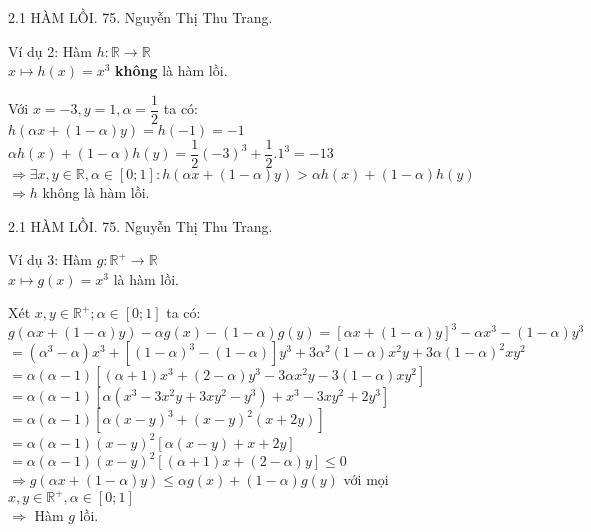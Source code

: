 \begin{frame}{2.1 HÀM LỒI. \hspace{6cm}  75. Nguyễn Thị Thu Trang.}
\begin{block}{Ví dụ 2: }
Hàm $h: \mathbb{R} \longrightarrow \mathbb{R}$\\
\hspace{1.2cm} $x\longmapsto h(x)= x^3$ \textbf{không} là hàm lồi.
\end{block}
Với $x = -3, y = 1, \alpha = \dfrac{1}{2}$ ta có:\\
$h(\alpha x+(1 -\alpha)y) = h(-1)=-1 $\\
$\alpha h(x) + (1-\alpha)h(y)= \dfrac{1}{2}(-3)^3 +\dfrac{1}{2}. 1^3 = -13 $\\
$\Rightarrow  \exists x, y \in \mathbb{R}, \alpha \in [0; 1]:  h(\alpha x+(1 -\alpha)y) > \alpha h(x) + (1-\alpha)h(y) $\\
$\Rightarrow h$ không là hàm lồi.
\end{frame}
\begin{frame}{2.1 HÀM LỒI. \hspace{6cm}  75. Nguyễn Thị Thu Trang.}
\begin{block}{Ví dụ 3: }
Hàm $g: \mathbb {R^+} \longrightarrow \mathbb {R}$\\
\hspace{1.25cm} $x\longmapsto g(x)= x^3$ là hàm lồi.
\end{block}
\pause
Xét $x,y \in \mathbb{R^+}; \alpha \in [0; 1]$ ta có: \\$g(\alpha x + (1- \alpha)y) - \alpha g(x) - (1-\alpha) g(y) = [\alpha x + (1- \alpha) y ]^3 - \alpha x^3 - (1-\alpha) y^3$ \\
\pause
$=(\alpha^3 -\alpha)x^3 +[(1-\alpha)^3 - (1-\alpha)]y^3 + 3\alpha^2 (1- \alpha) x^2 y + 3\alpha(1-\alpha)^2 xy^2$\\
$=\alpha(\alpha -1 )[(\alpha+1) x^3 + (2-\alpha)y^3 -3\alpha x^2y -3(1-\alpha)xy^2]  $\\
$=\alpha(\alpha-1)[\alpha(x^3-3x^2y+3xy^2-y^3)+x^3 -3xy^2 +2y^3]$\\
$=\alpha(\alpha-1)[\alpha(x-y)^3+(x-y)^2 (x+2y)]$\\
$=\alpha(\alpha-1)(x-y)^2[\alpha(x-y) +x+2y]$\\
$=\alpha(\alpha-1)(x-y)^2[(\alpha+1)x+(2-\alpha)y] \leq 0$\\
$\Rightarrow g(\alpha x + (1- \alpha)y)\leq \alpha g(x) + (1-\alpha) g(y)$ với mọi $x, y \in  \mathbb {R^+}, \alpha \in [0; 1]$\\
$\Rightarrow$  Hàm $g$ lồi.
\end{frame}
